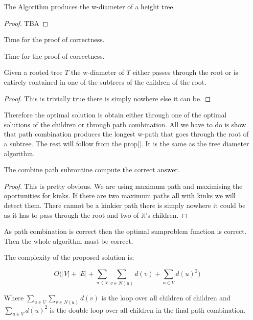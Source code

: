\begin{lem} The Algorithm produces the w-diameter of a height tree. \end{lem}


\begin{proof}
    TBA
\end{proof}

Time for the proof of correctness.

Time for the proof of correctness.


\begin{prop} Given a rooted tree $T$ the w-diameter of $T$ either passes through the root or is entirely contained in one of the subtrees of the children of the root. \end{prop}

\begin{proof}
    This is trivially true there is simply nowhere else it can be.
\end{proof}

Therefore the optimal solution is obtain either through one of the optimal solutions of the children or through path combination. All we have to do is show that path combination produces the longest w-path that goes through the root of a subtree. The rest will follow from the prop[]. It is the same as the tree diameter algorithm.

\begin{prop} The combine path subroutine compute the correct answer. \end{prop}

\begin{proof}
    This is pretty obvious. We are using maximum path and maximising the oportunities for kinks. If there are two maximum paths all with kinks we will detect them. There cannot be a kinkier path there is simply nowhere it could be as it has to pass through the root and two of it's children.
\end{proof}

As path combination is correct then the optimal sumproblem function is correct. Then the whole algorithm must be correct.

The complexity of the proposed solution is:

$$ O\bigg( |V| + |E| + \sum_{u \in V}{\sum_{v \in N(u)}{d(v)}} + \sum_{u \in V}{d(u)^2}  \bigg) $$

Where $\sum_{u \in V}{\sum_{v \in N(u)}{d(v)}}$ is the loop over all children of children and $\sum_{u \in V}{d(u)^2}$ is the double loop over all children in the final path combination.

